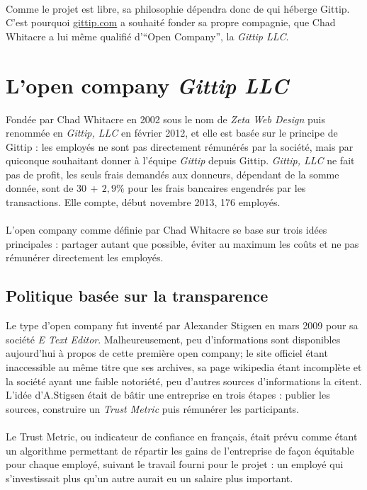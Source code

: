 \paragraph{}
Comme le projet est libre, sa philosophie dépendra donc de qui héberge Gittip.
C'est pourquoi \url{gittip.com} a souhaité fonder sa propre compagnie, que Chad
Whitacre a lui même qualifié d'``Open Company'', la \emph{Gittip LLC}.


    \section{L'open company \emph{Gittip LLC}}

Fondée par Chad Whitacre en 2002 sous le nom de \emph{Zeta Web Design} puis
renommée en \emph{Gittip, LLC} en février 2012, et elle est basée sur le
principe de Gittip : les employés ne sont pas directement rémunérés par la
société, mais par quiconque souhaitant donner à l'équipe \emph{Gittip} depuis
Gittip. \emph{Gittip, LLC} ne fait pas de profit, les seuls frais demandés aux
donneurs, dépendant de la somme donnée, sont de $30$\textcent $\, + \, 2,9\%{}$
pour les frais bancaires engendrés par les transactions. Elle compte,
début novembre 2013, 176 employés.

\paragraph{}
L'open company comme définie par Chad Whitacre se base sur trois idées
principales : partager autant que possible, éviter au maximum les coûts et ne
pas rémunérer directement les employés.

    \subsection{Politique basée sur la transparence}

Le type d'open company fut inventé par Alexander Stigsen en mars 2009 pour sa
société \emph{E Text Editor}. Malheureusement, peu d'informations sont
disponibles aujourd'hui à propos de cette première open company; le site
officiel étant inaccessible au même titre que ses archives, sa page wikipedia
étant incomplète et la société ayant une faible notoriété, peu d'autres sources
d'informations la citent. L'idée d'A.Stigsen était de bâtir une entreprise en
trois étapes : publier les sources, construire un \emph{Trust Metric} puis
rémunérer les participants.

\paragraph{}
Le Trust Metric, ou indicateur de confiance en français, était prévu comme
étant un algorithme permettant de répartir les gains de l'entreprise
de façon équitable pour chaque employé, suivant le travail fourni pour
le projet : un employé qui s'investissait plus qu'un autre aurait eu un salaire
plus important.

